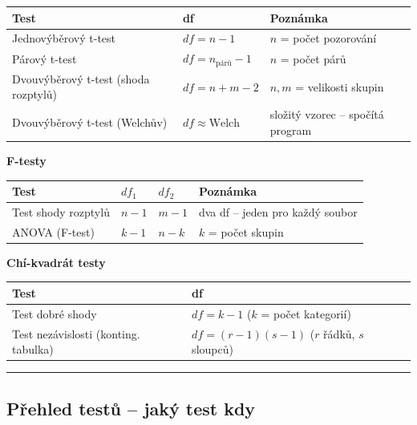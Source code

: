 \documentclass[a4paper, 11pt]{article}
\begin{document}
{\small
	\renewcommand{\arraystretch}{1.2}
	\begin{tabular}{p{} p{} p{}}
		\textbf{Test}                            & \textbf{df}                & \textbf{Poznámka}                     \\
		\midrule
		Jednovýběrový t-test                  & $df = n-1$                 & $n$ = počet pozorování              \\
		Párový t-test                          & $df = n_{\text{párů}}-1$ & $n$ = počet párů                    \\
		Dvouvýběrový t-test (shoda rozptylů) & $df = n+m-2$               & $n,m$ = velikosti skupin               \\
		Dvouvýběrový t-test (Welchův)        & $df \approx \text{Welch}$  & složitý vzorec -- spočítá program \\
	\end{tabular}

	\medskip
	\noindent\textbf{F-testy}

	\begin{tabular}{p{} p{} p{} p{}}
		\textbf{Test}        & $df_1$ & $df_2$ & \textbf{Poznámka}                 \\
		\midrule
		Test shody rozptylů & $n-1$  & $m-1$  & dva df -- jeden pro každý soubor \\
		ANOVA (F-test)       & $k-1$  & $n-k$  & $k$ = počet skupin                \\
	\end{tabular}

	\medskip
	\noindent\textbf{Chí-kvadrát testy}

	\begin{tabular}{p{} p{}}
		\textbf{Test}                         & \textbf{df}                                          \\
		\midrule
		Test dobré shody                     & $df = k-1$ \quad ($k$ = počet kategorií)           \\
		Test nezávislosti (konting. tabulka) & $df = (r-1)(s-1)$ \quad ($r$ řádků, $s$ sloupců) \\
	\end{tabular}
} %

\noindent\hrule\medskip

\subsection{Přehled testů -- jaký test kdy}
\end{document}
